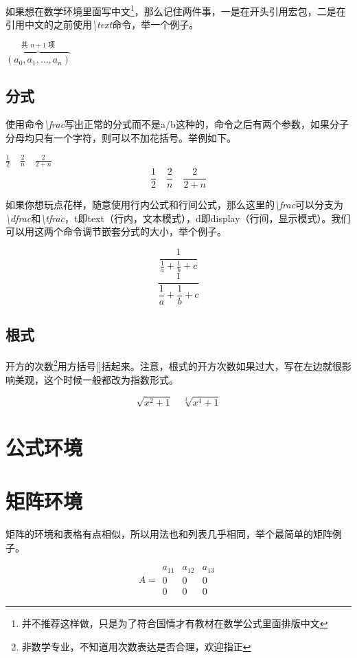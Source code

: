 如果想在数学环境里面写中文\footnote{并不推荐这样做，只是为了符合国情才有教材在数学公式里面排版中文}，那么记住两件事，一是在开头引用\CTeX 宏包，二是在引用中文的之前使用\emph{\textbackslash text}命令，举一个例子。
\begin{codeshow}
$\overbrace{(a_0,a_1,\dots,a_n)}
^{\text{共 $n+1$ 项}}$
\end{codeshow}

\subsection{分式}
使用命令\emph{\textbackslash frac}写出正常的分式而不是a/b这种的，命令之后有两个参数，如果分子分母均只有一个字符，则可以不加花括号。举例如下。
\begin{codeshow}
$\frac12 \quad \frac2n
\quad \frac{2}{2+n}$
\[ \frac12 \quad \frac2n
\quad \frac{2}{2+n} \]
\end{codeshow}

如果你想玩点花样，随意使用行内公式和行间公式，那么这里的\emph{\textbackslash frac}可以分支为\emph{\textbackslash dfrac}和\emph{\textbackslash tfrac}，t即text（行内，文本模式），d即display（行间，显示模式）。我们可以用这两个命令调节嵌套分式的大小，举个例子。
\begin{codeshow}
\[ \frac{1}{\tfrac1a+\tfrac1b+c} \]
\[ \frac{1}{\dfrac1a+\dfrac1b+c} \]
\end{codeshow}

\subsection{根式}
开方的次数\footnote{非数学专业，不知道用次数表达是否合理，欢迎指正}用方括号[]括起来。注意，根式的开方次数如果过大，写在左边就很影响美观，这个时候一般都改为指数形式。
\begin{codeshow}
\[
\sqrt{x^2+1}\quad \sqrt[3]{x^4+1}
\]
\end{codeshow}

\section{公式环境}

\section{矩阵环境}
矩阵的环境和表格有点相似，所以用法也和列表几乎相同，举个最简单的矩阵例子。
\begin{codeshow}
\[
A=\begin{matrix}
a_{11} & a_{12} & a_{13}\\
0 & 0 & 0\\
0 & 0 & 0
\end{matrix}
\]
\end{codeshow}

